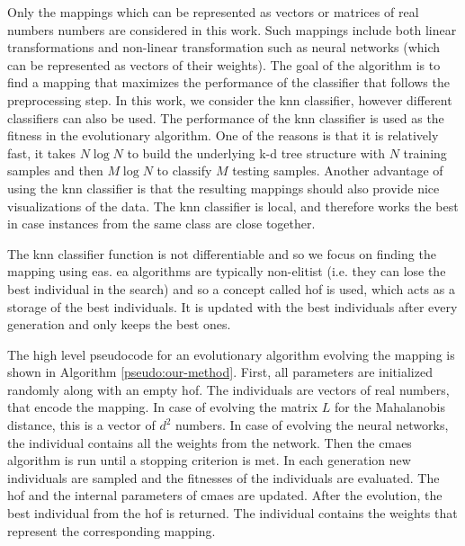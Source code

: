 \documentclass[12pt,a4paper]{report}
\begin{document}
Only the mappings which can be represented as vectors or matrices of real numbers numbers are considered in this work. Such mappings include both linear transformations and non-linear transformation such as neural networks (which can be represented as vectors of their weights). The goal of the algorithm is to find a mapping that maximizes the performance of the classifier that follows the preprocessing step. In this work, we consider the \ac{knn} classifier, however different classifiers can also be used. The performance of the \ac{knn} classifier is used as the fitness in the evolutionary algorithm. One of the reasons is that it is relatively fast, it takes $N\log{N}$ to build the underlying k-d tree structure with $N$ training samples and then $M \log{N}$ to classify $M$ testing samples. Another advantage of using the \ac{knn} classifier is that the resulting mappings should also provide nice visualizations of the data. The \ac{knn} classifier is local, and therefore works the best in case instances from the same class are close together.

The \ac{knn} classifier function is not differentiable and so we focus on finding the mapping using \aclp{ea}. \Ac{ea} algorithms are typically non-elitist (i.e. they can lose the best individual in the search) and so a concept called \acf{hof} is used, which acts as a storage of the best individuals. It is updated with the best individuals after every generation and only keeps the best ones.

The high level pseudocode for an evolutionary algorithm evolving the mapping is shown in Algorithm \ref{pseudo:our-method}. First, all parameters are initialized randomly along with an empty \ac{hof}. The individuals are vectors of real numbers, that encode the mapping. In case of evolving the matrix $L$ for the Mahalanobis distance, this is a vector of $d^2$ numbers. In case of evolving the neural networks, the individual contains all the weights from the network. Then the \ac{cmaes} algorithm is run until a stopping criterion is met. In each generation new individuals are sampled and the fitnesses of the individuals are evaluated. The \ac{hof} and the internal parameters of \ac{cmaes} are updated. After the evolution, the best individual from the \ac{hof} is returned. The individual contains the weights that represent the corresponding mapping.
\end{document}
